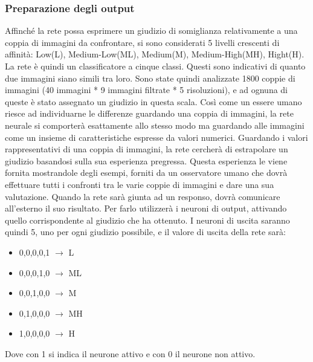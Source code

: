 \documentclass[a4paper,11pt]{article}
\begin{document}
    \subsubsection{Preparazione degli output}
    Affinché la rete possa esprimere un giudizio di somiglianza relativamente a una coppia di immagini da confrontare,
    si sono considerati 5 livelli crescenti di affinità: Low(L), Medium-Low(ML), Medium(M), Medium-High(MH), Hight(H).
    La rete è quindi un classificatore a cinque classi. Questi sono indicativi di quanto due immagini siano simili tra loro.
    Sono state quindi analizzate 1800 coppie di immagini (40 immagini * 9 immagini filtrate * 5 risoluzioni), e ad ognuna di queste
    è stato assegnato un giudizio in questa scala.
    Così come un essere umano riesce ad individuarne le differenze guardando una coppia di immagini, la rete neurale si comporterà esattamente allo stesso modo ma 
    guardando alle immagini come un insieme di caratteristiche espresse da valori numerici.
    Guardando i valori rappresentativi di una coppia di immagini, la rete cercherà di estrapolare un giudizio basandosi sulla sua esperienza pregressa.
    Questa esperienza le viene fornita mostrandole degli esempi, forniti da un osservatore umano che dovrà effettuare tutti i confronti tra le varie coppie di immagini e dare una sua valutazione.
    Quando la rete sarà giunta ad un responso, dovrà comunicare all'esterno il suo risultato. Per farlo utilizzerà i neuroni di output, attivando quello corrispondente al giudizio che ha ottenuto.
    I neuroni di uscita saranno quindi 5, uno per ogni giudizio possibile, e il valore di uscita della rete sarà:
    \begin{itemize}
        \item {0,0,0,0,1} $\rightarrow$ L 
        \item {0,0,0,1,0} $\rightarrow$ ML
        \item {0,0,1,0,0} $\rightarrow$ M
        \item {0,1,0,0,0} $\rightarrow$ MH
        \item {1,0,0,0,0} $\rightarrow$ H
    \end{itemize}
    Dove con 1 si indica il neurone attivo e con 0 il neurone non attivo.
    \newpage
\end{document}
